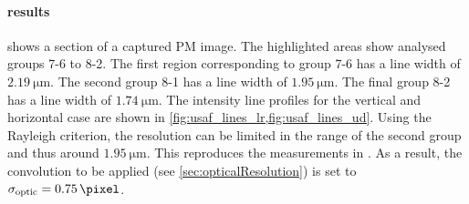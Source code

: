 \paragraph{results}
 shows a section of a captured PM image.
The highlighted areas show analysed groups 7-6 to 8-2.
The first region corresponding to group 7-6  has a line width of $\SI{2.19}{\micro\meter}$.
The second group 8-1  has a line width of $\SI{1.95}{\micro\meter}$.
The final group 8-2  has a line width of $\SI{1.74}{\micro\meter}$.
The intensity line profiles for the vertical and horizontal case are shown in \cref{fig:usaf_lines_lr,fig:usaf_lines_ud}.
% 
Using the Rayleigh criterion, the resolution can be limited in the range of the second group and thus around $\SI{1.95}{\micro\meter}$.
This reproduces the measurements in \cite{MenzelMaster} .
As a result, the convolution to be applied (see \cref{sec:opticalResolution}) is set to $\opticsigma = \SI{0.75}{\pixel}$.
% 
% 
% 
